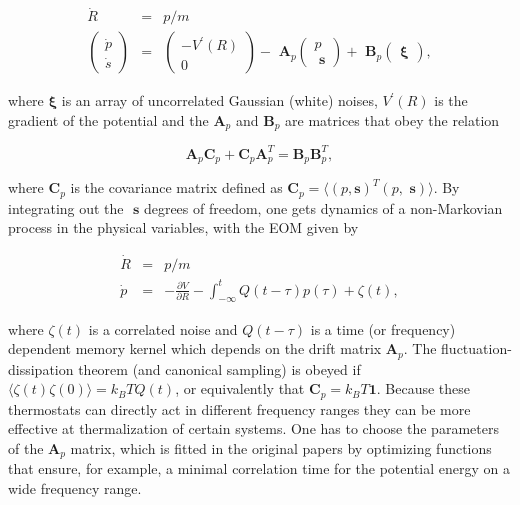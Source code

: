 \documentclass[a4paper,11pt]{scrartcl}
\begin{document}
\begin{enumerate}
\begin{eqnarray}
\dot{R} & = & p/m \\
\begin{pmatrix} \dot{p} \\ { \dot{s}}\end{pmatrix} & = & \begin{pmatrix} -V^{\prime}(R) \\ 0 \end{pmatrix} - %
{\textbf{ A}}_p
\begin{pmatrix} p \\ {\textbf{ s}}\end{pmatrix} +
{\textbf{ B}}_p \begin{pmatrix} {\boldsymbol \xi} \end{pmatrix}, \label{eq:gle-eom}
\end{eqnarray}

\noindent where ${\boldsymbol \xi}$ is an array of uncorrelated Gaussian (white) noises, $V^{\prime}(R)$ is the gradient of the potential and the  ${\textbf{A}}_p$ and ${\textbf{B} }_p$ are matrices that obey the relation


\begin{equation}
{\textbf{A}_p} {\textbf{C}_p}  + {\textbf{C}_p }{\textbf{A}_p^T}  = {\textbf{B}_p} {\textbf{B}_p^T},
\end{equation}

\noindent where ${\textbf{C}}_p$ is the covariance matrix defined as $\textbf{C}_p = \langle (p, \textbf{s})^T (p, \textbf{ s})\rangle$. By integrating out the $\textbf{ s}$ degrees of freedom, one gets dynamics of a non-Markovian process in the physical variables, with the EOM given by

\begin{eqnarray}
\dot{R} &=& p/m \\
\dot{p} &=& -\frac{\partial V}{\partial R} - \int_{-\infty}^t Q(t-\tau)p(\tau) + \zeta(t),
\end{eqnarray}

\noindent where $\zeta(t)$ is a correlated noise and $Q(t-\tau)$ is a time (or frequency) dependent memory kernel which depends on the drift matrix ${\textbf{A}}_p$.  The fluctuation-dissipation theorem (and  canonical sampling) is obeyed if $ \langle \zeta(t) \zeta(0) \rangle = k_B T Q(t)$, or equivalently that ${\textbf{C}}_p = k_B T \textbf{1}$. Because these thermostats can directly act in different frequency ranges they can be more effective at thermalization of certain systems. One has to choose the parameters of the ${\textbf{A}}_p$ matrix, which is fitted in the original papers \cite{ceriotti10} by optimizing functions that ensure, for example, a minimal correlation time for the potential energy on a wide frequency range.



\end{enumerate}
\end{document}
